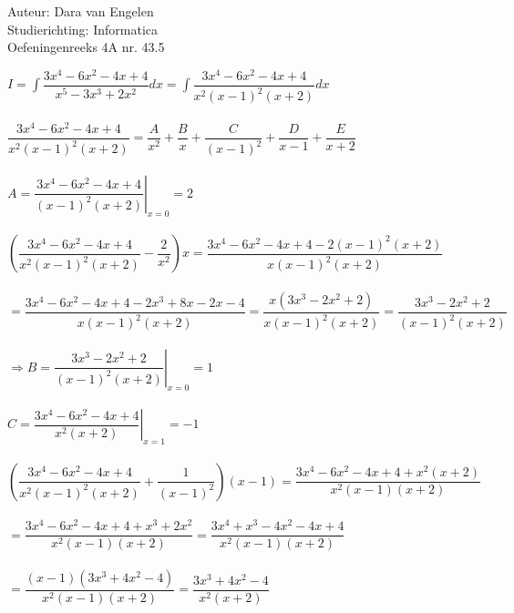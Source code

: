 \documentclass[a4paper]{article}
\begin{document}
  
\noindent \large Auteur: Dara van Engelen \\
\noindent \large Studierichting: Informatica\\
\noindent \large Oefeningenreeks 4A nr. 43.5\\

\medskip

\normalsize

$ I = \displaystyle\int \dfrac{3x^4-6x^2-4x+4}{x^5-3x^3+2x^2}dx = \displaystyle\int \dfrac{3x^4-6x^2-4x+4}{x^2(x-1)^2(x+2)}dx$\\\\

$\dfrac{3x^4-6x^2-4x+4}{x^2(x-1)^2(x+2)} =  \dfrac{A}{x^2} + \dfrac{B}{x} + \dfrac{C}{(x-1)^2} + \dfrac{D}{x-1} + \dfrac{E}{x+2}$\\\\

$A  =\left. \dfrac{3x^4-6x^2-4x+4}{(x-1)^2(x+2)} \right|_{x=0} = 2$\\\\

$\left( \dfrac{3x^4-6x^2-4x+4}{x^2(x-1)^2(x+2)} - \dfrac{2}{x^2}\right)x = \dfrac{3x^4-6x^2-4x+4-2(x-1)^2(x+2)}{x(x-1)^2(x+2)} $\\\\

$= \dfrac{3x^4-6x^2-4x+4-2x^3+8x-2x-4}{x(x-1)^2(x+2)} = \dfrac{x(3x^3-2x^2+2)}{x(x-1)^2(x+2)} = \dfrac{3x^3-2x^2+2}{(x-1)^2(x+2)}$\\\\

$\Rightarrow B = \left. \dfrac{3x^3-2x^2+2}{(x-1)^2(x+2)} \right|_{x=0} = 1$\\\\

$C = \left. \dfrac{3x^4-6x^2-4x+4}{x^2(x+2)} \right|_{x=1} = -1$\\\\

$\left( \dfrac{3x^4-6x^2-4x+4}{x^2(x-1)^2(x+2)} + \dfrac{1}{(x-1)^2} \right)(x-1) = \dfrac{3x^4-6x^2-4x+4+x^2(x+2)}{x^2(x-1)(x+2)}$\\\\

$= \dfrac{3x^4-6x^2-4x+4+x^3+2x^2}{x^2(x-1)(x+2)} = \dfrac{3x^4+x^3-4x^2-4x+4}{x^2(x-1)(x+2)}$\\\\

$= \dfrac{(x-1)(3x^3+4x^2-4)}{x^2(x-1)(x+2)} = \dfrac{3x^3+4x^2-4}{x^2(x+2)}$\\\\
\end{document}
